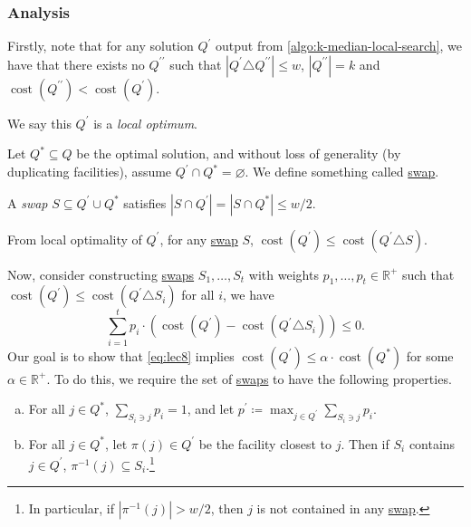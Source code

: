 \subsubsection{Analysis}
Firstly, note that for any solution \(Q^\prime \) output from \autoref{algo:k-median-local-search}, we have that there exists no \(Q^{\prime\prime}\) such that \(\left\vert Q^\prime \triangle Q^{\prime\prime} \right\vert \leq w\), \(\left\vert Q^{\prime\prime} \right\vert = k\) and \(\mathop{\mathrm{cost}}(Q^{\prime\prime}) < \mathop{\mathrm{cost}}(Q^\prime )\).

\begin{note}
	We say this \(Q^\prime \) is a \emph{local optimum}.
\end{note}

Let \(Q^{\ast} \subseteq Q\) be the optimal solution, and without loss of generality (by duplicating facilities), assume \(Q^\prime \cap Q^{\ast} = \varnothing \). We define something called \hyperref[not:swap]{swap}.

\begin{notation}[Swap]\label{not:swap}
	A \emph{swap} \(S \subseteq Q^\prime \cup Q^{\ast} \) satisfies \(\left\vert S \cap Q^\prime  \right\vert = \left\vert S \cap Q^{\ast}  \right\vert \leq w / 2\).
\end{notation}

\begin{note}
	From local optimality of \(Q^\prime \), for any \hyperref[not:swap]{swap} \(S\), \(\mathop{\mathrm{cost}}(Q^\prime ) \leq \mathop{\mathrm{cost}}(Q^\prime \triangle S)\).
\end{note}

Now, consider constructing \hyperref[not:swap]{swaps} \(S_1, \ldots, S_t\) with weights \(p_1, \ldots , p_t \in \mathbb{R} ^+\) such that \(\mathop{\mathrm{cost}}(Q^\prime ) \leq \mathop{\mathrm{cost}}(Q^\prime \triangle S_i)\) for all \(i\), we have
\begin{equation}\label{eq:lec8}
	\sum_{i=1} ^t p_i \cdot (\mathop{\mathrm{cost}}(Q^\prime ) - \mathop{\mathrm{cost}}(Q^\prime \triangle S_i)) \leq 0.
\end{equation}
Our goal is to show that \autoref{eq:lec8} implies \(\mathop{\mathrm{cost}}(Q^\prime ) \leq \alpha\cdot \mathop{\mathrm{cost}}(Q^{\ast} )\) for some \(\alpha \in \mathbb{R} ^+\). To do this, we require the set of \hyperref[not:swap]{swaps} to have the following properties.

\begin{enumerate}[(a)]
	\item For all \(j\in Q^{\ast} \), \(\sum_{S_i \ni j}p_i = 1 \), and let \(p^\prime \coloneqq \max _{j\in Q^\prime }\sum_{S_i\ni j}p_i\).
	\item For all \(j\in Q^{\ast} \), let \(\pi (j)\in Q^\prime \) be the facility closest to \(j\). Then if \(S_i\) contains \(j\in Q^\prime \), \(\pi ^{-1} (j)\subseteq S_i\).\footnote{In particular, if \(\left\vert \pi ^{-1} (j) \right\vert > w / 2 \), then \(j\) is not contained in any \hyperref[not:swap]{swap}.}
\end{enumerate}

